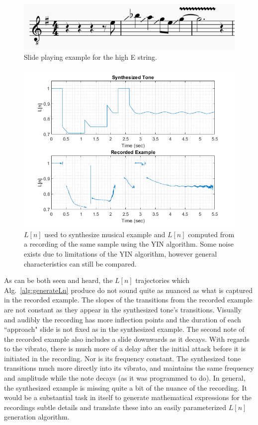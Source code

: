 \documentclass[../main.tex]{subfiles}
\begin{document}
\begin{figure}[h]
    \centering
    \includegraphics[scale=.75]{./images/pictures/slideLick.png}
    \caption{Slide playing example for the high E string.}
    \label{fig:slideLick}
\end{figure}

\begin{figure}[h]
    \centering
    \includegraphics[scale=.65]{./images/plots/L_nComparison.png}
    \caption{$L[n]$ used to synthesize musical example and $L[n]$ computed from a recording of the same sample using the YIN algorithm. Some noise exists due to limitations of the YIN algorithm, however general characteristics can still be compared.}
    \label{fig:LnCompare}
\end{figure}

As can be both seen and heard, the $L[n]$ trajectories which Alg.~\ref{alg:generateLn} produce do not sound quite as nuanced as what is captured in the recorded example. The slopes of the transitions from the recorded example are not constant as they appear in the synthesized tone's transitions. Visually and audibly the recording has more inflection points and the duration of each ``approach" slide is not fixed as in the synthesized example. The second note of the recorded example also includes a slide downwards as it decays. With regards to the vibrato, there is much more of a delay after the initial attack before it is initiated in the recording. Nor is its frequency constant. The synthesized tone transitions much more directly into its vibrato, and maintains the same frequency and amplitude while the note decays (as it was programmed to do). In general, the synthesized example is missing quite a bit of the nuance of the recording. It would be a substantial task in itself to generate mathematical expressions for the recordings subtle details and translate these into an easily parameterized $L[n]$ generation algorithm.
\end{document}
